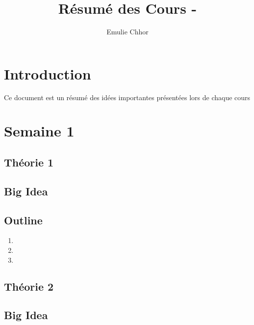 \documentclass{article}
\begin{document}
\title{Résumé des Cours - }
\author{Emulie Chhor}
\maketitle

\section*{Introduction}

Ce document est un résumé des idées importantes présentées lors de chaque cours

\newtheorem{definition}{Definition}[subsection]
\newtheorem{theorem}{Theorem}[subsection]
\newtheorem{corollary}{Corollary}[subsection]
\newtheorem{lemma}[theorem]{Lemma}
\newtheorem{proposition}{Proposition}[section]
\newtheorem{axiom}{Axiome}
\newtheorem{property}{Propriété}[subsection]
\newtheorem*{remark}{Remarque}
\newtheorem*{problem}{Problème}
\newtheorem*{intuition}{Intuition}


\pagebreak
\section{Semaine 1}
\subsection{Théorie 1}

\subsection*{Big Idea}

\subsection*{Outline}
    \begin{enumerate}
    \item
    \item
    \item
    \end{enumerate}


\subsection{Théorie 2}
\subsection*{Big Idea}
\end{document}
